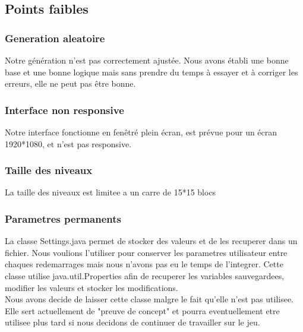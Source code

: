 \documentclass[../main.tex]{subfiles}
\begin{document}
\subsection{Points faibles}

\subsubsection{Generation aleatoire}
Notre génération n’est pas correctement ajustée.
Nous avons établi une bonne base et une bonne logique mais sans prendre du temps à essayer et à corriger les erreurs, elle ne peut pas être bonne.

\subsubsection{Interface non responsive}
Notre interface fonctionne en fenêtré plein écran, est prévue pour un écran 1920*1080, et n’est pas responsive.

\subsubsection{Taille des niveaux}
La taille des niveaux est limitee a un carre de 15*15 blocs

\subsubsection{Parametres permanents}
La classe Settings.java permet de stocker des valeurs et de les recuperer dans un fichier. Nous voulions l'utiliser pour conserver les parametres utilisateur entre chaques redemarrages mais nous n'avons pas eu le temps de l'integrer. Cette classe utilise java.util.Properties afin de recuperer les variables sauvegardees, modifier les valeurs et stocker les modifications. \\

Nous avons decide de laisser cette classe malgre le fait qu'elle n'est pas utilisee. Elle sert actuellement de "preuve de concept" et pourra eventuellement etre utilisee plus tard si nous decidons de continuer de travailler sur le jeu.

\newpage
\end{document}
